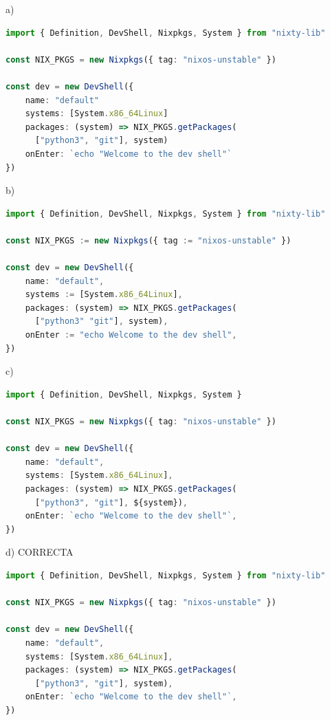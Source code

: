 \begin{opcion}{a)}
\begin{lstlisting}[language=TypeScript]
import { Definition, DevShell, Nixpkgs, System } from "nixty-lib"

const NIX_PKGS = new Nixpkgs({ tag: "nixos-unstable" })

const dev = new DevShell({
    name: "default"
    systems: [System.x86_64Linux]
    packages: (system) => NIX_PKGS.getPackages(
      ["python3", "git"], system)
    onEnter: `echo "Welcome to the dev shell"`
})
\end{lstlisting}
\end{opcion}

\begin{opcion}{b)}
\begin{lstlisting}[language=TypeScript]
import { Definition, DevShell, Nixpkgs, System } from "nixty-lib"

const NIX_PKGS := new Nixpkgs({ tag := "nixos-unstable" })

const dev = new DevShell({
    name: "default",
    systems := [System.x86_64Linux],
    packages: (system) => NIX_PKGS.getPackages(
      ["python3" "git"], system),
    onEnter := "echo Welcome to the dev shell",
})
\end{lstlisting}
\end{opcion}

\begin{opcion}{c)}
\begin{lstlisting}[language=TypeScript]
import { Definition, DevShell, Nixpkgs, System }

const NIX_PKGS = new Nixpkgs({ tag: "nixos-unstable" })

const dev = new DevShell({
    name: "default",
    systems: [System.x86_64Linux],
    packages: (system) => NIX_PKGS.getPackages(
      ["python3", "git"], ${system}),
    onEnter: `echo "Welcome to the dev shell"`,
})
\end{lstlisting}
\end{opcion}

\begin{opcion}{d)}
CORRECTA
\begin{lstlisting}[language=TypeScript]
import { Definition, DevShell, Nixpkgs, System } from "nixty-lib"

const NIX_PKGS = new Nixpkgs({ tag: "nixos-unstable" })

const dev = new DevShell({
    name: "default",
    systems: [System.x86_64Linux],
    packages: (system) => NIX_PKGS.getPackages(
      ["python3", "git"], system),
    onEnter: `echo "Welcome to the dev shell"`,
})
\end{lstlisting}
\end{opcion}

